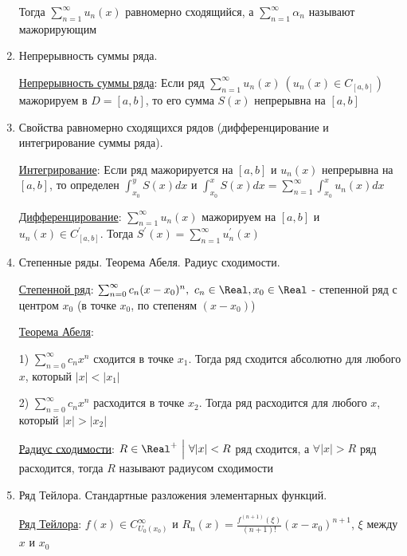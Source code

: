 \begin{enumerate}
    Тогда $\sum_{n = 1}^\infty u_n(x)$ равномерно сходящийся, а $\sum_{n = 1}^\infty \alpha_n$ называют мажорирующим

    \item Непрерывность суммы ряда.

    \hyperlink{functionalsumcontinuity}{Непрерывность суммы ряда}: \Ths Если ряд $\sum_{n = 1}^\infty u_n(x) \ (u_n(x) \in C_{[a, b]})$ мажорируем в $D = [a, b]$, то 
    его сумма $S(x)$ непрерывна на $[a, b]$

    \item Свойства равномерно сходящихся рядов (дифференцирование и интегрирование суммы
    ряда).

    \hyperlink{functionalsumintegral}{Интегрирование}: \Ths Если ряд мажорируется на $[a, b]$ и $u_n(x)$ непрерывна на $[a, b]$, то определен $\int_{x_0}^y S(x)dx$ и 
    $\int_{x_0}^x S(x)dx  = \sum_{n = 1}^\infty \int_{x_0}^x u_n(x) dx$

    \hyperlink{functionalsumderivative}{Дифференцирование}: \Ths $\sum_{n = 1}^\infty u_n(x)$ мажорируем на $[a, b]$ и $u_n(x) \in C^\prime_{[a, b]}$.
    Тогда $S^\prime(x) = \sum_{n = 1}^\infty u^\prime_n(x)$

    \item Степенные ряды. Теорема Абеля. Радиус сходимости.

    \hyperlink{powerseries}{Степенной ряд}: $\sum_{n = 0}^\infty c_n(x - x_0)^n, \ c_n \in \Real, x_0 \in \Real$ - степенной ряд с центром $x_0$ (в точке $x_0$, по степеням $(x - x_0)$)

    \hyperlink{abelstheorem}{Теорема Абеля}:  

    1) $\sum_{n = 0}^\infty c_n x^n$ сходится в точке $x_1$. Тогда ряд сходится абсолютно для любого $x$, который $|x| < |x_1|$

    2) $\sum_{n = 0}^\infty c_n x^n$ расходится в точке $x_2$. Тогда ряд расходится для любого $x$, который $|x| > |x_2|$

    \hyperlink{convergenceradius}{Радиус сходимости}: $R \in \Real^+ \ \Big| \ \forall |x| < R $ ряд сходится, а $\forall |x| > R$ ряд расходится, тогда $R$ называют радиусом сходимости

    \item Ряд Тейлора. Стандартные разложения элементарных функций.

    \hyperlink{taylorsseries}{Ряд Тейлора}: $f(x) \in C^\infty_{U_0(x_0)}$ и $R_n(x) = \frac{f^{(n + 1)}(\xi)}{(n + 1)!} (x - x_0)^{n + 1}$, $\xi$ между $x$ и $x_0$
    

\end{enumerate}
